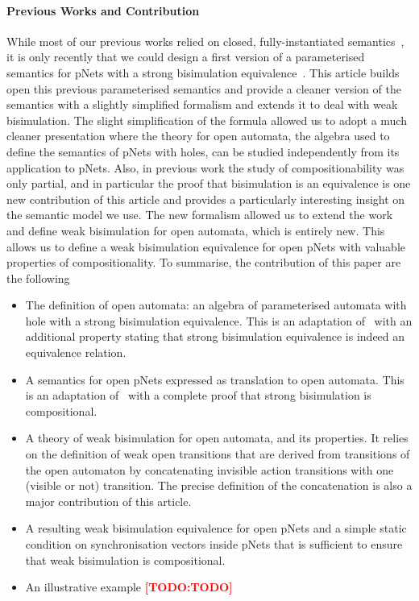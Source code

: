 \documentclass{lncs/llncs}
\newcommand{\TODO}[1]{\textcolor{red}{\textbf{[TODO:#1]}}}
\begin{document}
\paragraph{Previous Works and Contribution}
While most of our previous works relied on closed, fully-instantiated semantics~\cite{BBCHM:article2009,AmeurBoulifa2017,HKM-FASE16}, it is only recently that we could design a first version of a  parameterised semantics for pNets with a strong bisimulation equivalence~\cite{henrio:Forte2016}. This article builds open this previous parameterised semantics and provide a cleaner version of the semantics with a slightly simplified formalism and extends it to deal with weak bisimulation. The slight simplification of the formula allowed us to adopt a much cleaner presentation where the theory for open automata, the algebra used to define the semantics of pNets with holes, can be studied independently from its application to pNets. Also, in previous work the study of compositionability was only partial, and in particular the proof that bisimulation is an equivalence is one new contribution of this article and provides a particularly interesting insight on the semantic model we use.
The new formalism allowed us to extend the work and define weak bisimulation  for open automata, which is entirely new. This allows us to define a weak bisimulation equivalence for open pNets with valuable properties of compositionality. 
To summarise, the contribution of this paper are the following
\begin{itemize}
\item The definition of open automata: an algebra of parameterised automata with hole with a strong bisimulation equivalence. This is an adaptation of~\cite{henrio:Forte2016} with an additional property stating that strong bisimulation equivalence is indeed an equivalence relation.
\item A semantics for open pNets expressed as translation to open automata. This is an adaptation of~\cite{henrio:Forte2016} with a complete proof that strong bisimulation is compositional.
\item A theory of weak bisimulation for open automata, and its properties. It relies on the definition of weak open transitions that are derived from transitions of the open automaton by concatenating invisible action transitions with one (visible or not) transition. The precise definition of the concatenation is also a major contribution of this article.
\item A resulting weak bisimulation equivalence for open pNets and a simple static condition on synchronisation vectors inside pNets that is sufficient to ensure that weak bisimulation is compositional.
\item An illustrative example \TODO{TODO}
\end{itemize}
\end{document}

